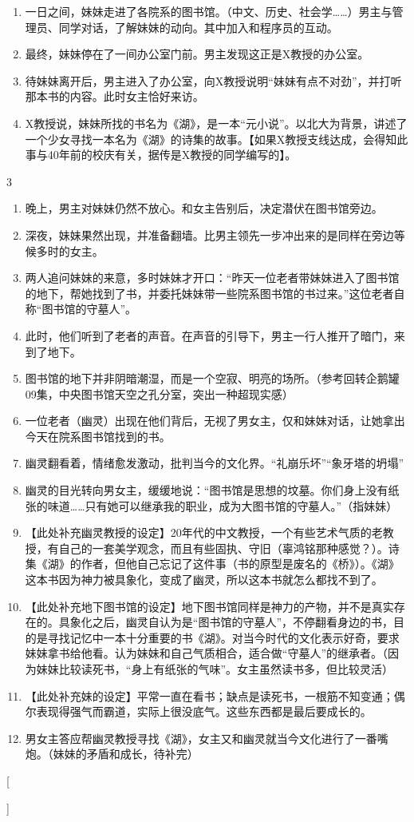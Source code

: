{{{\begin{enumerate}
	\item 一日之间，妹妹走进了各院系的图书馆。（中文、历史、社会学……）男主与管理员、同学对话，了解妹妹的动向。其中加入和程序员的互动。
	\item 最终，妹妹停在了一间办公室门前。男主发现这正是X教授的办公室。
	\item 待妹妹离开后，男主进入了办公室，向X教授说明“妹妹有点不对劲”，并打听那本书的内容。此时女主恰好来访。
	\item X教授说，妹妹所找的书名为《湖》，是一本“元小说”。以北大为背景，讲述了一个少女寻找一本名为《湖》的诗集的故事。【如果X教授支线达成，会得知此事与40年前的校庆有关，据传是X教授的同学编写的】。 
        \end{enumerate}
        }
        {3}{
            \begin{enumerate}
        	\item 晚上，男主对妹妹仍然不放心。和女主告别后，决定潜伏在图书馆旁边。
	\item 深夜，妹妹果然出现，并准备翻墙。比男主领先一步冲出来的是同样在旁边等候多时的女主。
	\item 两人追问妹妹的来意，多时妹妹才开口：“昨天一位老者带妹妹进入了图书馆的地下，帮她找到了书，并委托妹妹带一些院系图书馆的书过来。”这位老者自称“图书馆的守墓人”。
	\item 此时，他们听到了老者的声音。在声音的引导下，男主一行人推开了暗门，来到了地下。
	\item 图书馆的地下并非阴暗潮湿，而是一个空寂、明亮的场所。（参考回转企鹅罐09集，中央图书馆天空之孔分室，突出一种超现实感）
	\item 一位老者（幽灵）出现在他们背后，无视了男女主，仅和妹妹对话，让她拿出今天在院系图书馆找到的书。
	\item 幽灵翻看着，情绪愈发激动，批判当今的文化界。“礼崩乐坏”“象牙塔的坍塌”
	\item 幽灵的目光转向男女主，缓缓地说：“图书馆是思想的坟墓。你们身上没有纸张的味道……只有她可以继承我的职业，成为大图书馆的守墓人。”（指妹妹）
	\item 【此处补充幽灵教授的设定】20年代的中文教授，一个有些艺术气质的老教授，有自己的一套美学观念，而且有些固执、守旧（辜鸿铭那种感觉？）。诗集《湖》的作者，但他自己忘记了这件事（书的原型是废名的《桥》）。《湖》这本书因为神力被具象化，变成了幽灵，所以这本书就怎么都找不到了。
	\item 【此处补充地下图书馆的设定】地下图书馆同样是神力的产物，并不是真实存在的。具象化之后，幽灵自认为是“图书馆的守墓人”，不停翻看身边的书，目的是寻找记忆中一本十分重要的书《湖》。对当今时代的文化表示好奇，要求妹妹拿书给他看。认为妹妹和自己气质相合，适合做“守墓人”的继承者。（因为妹妹比较读死书，“身上有纸张的气味”。女主虽然读书多，但比较灵活）
	\item 【此处补充妹的设定】平常一直在看书；缺点是读死书，一根筋不知变通；偶尔表现得强气而霸道，实际上很没底气。这些东西都是最后要成长的。
	\item 男女主答应帮幽灵教授寻找《湖》，女主又和幽灵就当今文化进行了一番嘴炮。（妹妹的矛盾和成长，待补完）
	 \end{enumerate}
        }
    }[\PackageError{tree}{Undefined option to tree: #1}{}]%
    }